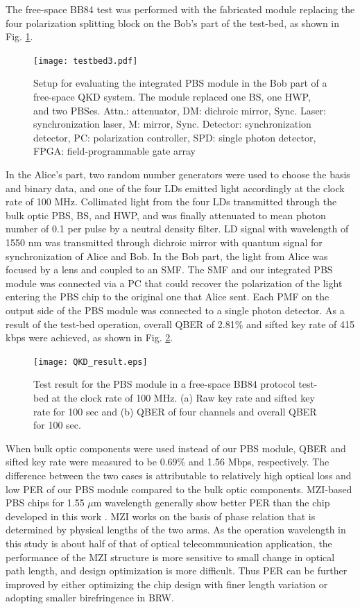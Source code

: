 \documentclass[letterpaper, 10pt]{article}
\begin{document}
The free-space BB84 test was performed with the fabricated module replacing the four polarization splitting block on the Bob's part of the test-bed, as shown in Fig. \ref{fig:testbed}.
\begin{figure}
  \centering
  \texttt{[image: testbed3.pdf]}
  \caption{Setup for evaluating the integrated PBS module in the Bob part of a free-space QKD system. The module replaced one BS, one HWP, and two PBSes. Attn.: attenuator, DM: dichroic mirror, Sync. Laser: synchronization laser, M: mirror, Sync. Detector: synchronization detector, PC: polarization controller, SPD: single photon detector, FPGA: field-programmable gate array}
  \label{fig:testbed}
\end{figure}
In the Alice's part, two random number generators were used to choose the basis and binary data, and one of the four LDs emitted light accordingly at the clock rate of 100 MHz.
Collimated light from the four LDs transmitted  through the bulk optic PBS, BS, and HWP, and was finally attenuated to mean photon number of 0.1 per pulse by a neutral density filter.
LD signal with wavelength of 1550 nm was transmitted through dichroic mirror with quantum signal for synchronization of Alice and Bob.
In the Bob part, the light from Alice was  focused by a lens and coupled to an SMF.
The SMF and our integrated PBS module was connected via a PC that could recover the polarization of the light entering the PBS chip to the original one that Alice sent.
Each PMF on the output side of the PBS module was connected to a single photon detector.
As a result of the test-bed operation, overall QBER of 2.81\% and sifted key rate of 415 kbps were achieved, as shown in Fig. \ref{fig:QKD_result}.
\begin{figure}[ht]
  \centering
  \texttt{[image: QKD\_result.eps]}
  \caption{Test result for the PBS module in a free-space BB84 protocol test-bed at the clock rate of 100 MHz. (a) Raw key rate and sifted key rate for 100 sec and (b) QBER of four channels and overall QBER for 100 sec.}
  \label{fig:QKD_result}
\end{figure}
When bulk optic components were used instead of our PBS module, QBER and sifted key rate were measured to be 0.69\% and 1.56 Mbps, respectively.
The difference between the two cases is attributable to relatively high optical loss and low PER of our PBS module compared to the bulk optic components.
MZI-based PBS chips for 1.55 $\mu$m wavelength generally show better PER than the chip developed in this work \cite{Hashizume:2015ta}.
MZI works on the basis of phase relation that is determined by physical lengths of the two arms.
As the operation wavelength in this study is about half of that of optical telecommunication application, the performance of the MZI structure is more sensitive to small change in optical path length, and design optimization is more difficult.
Thus PER can be further improved by either optimizing the chip design with finer length variation or adopting smaller birefringence in BRW.
\end{document}
